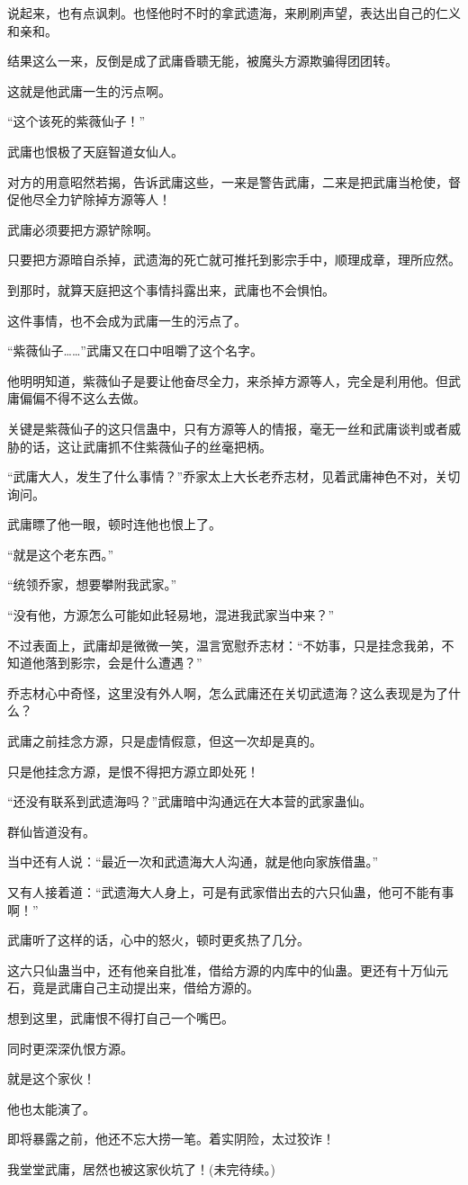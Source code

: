 \begin{this_body}
说起来，也有点讽刺。也怪他时不时的拿武遗海，来刷刷声望，表达出自己的仁义和亲和。

结果这么一来，反倒是成了武庸昏聩无能，被魔头方源欺骗得团团转。

这就是他武庸一生的污点啊。

“这个该死的紫薇仙子！”

武庸也恨极了天庭智道女仙人。

对方的用意昭然若揭，告诉武庸这些，一来是警告武庸，二来是把武庸当枪使，督促他尽全力铲除掉方源等人！

武庸必须要把方源铲除啊。

只要把方源暗自杀掉，武遗海的死亡就可推托到影宗手中，顺理成章，理所应然。

到那时，就算天庭把这个事情抖露出来，武庸也不会惧怕。

这件事情，也不会成为武庸一生的污点了。

“紫薇仙子……”武庸又在口中咀嚼了这个名字。

他明明知道，紫薇仙子是要让他奋尽全力，来杀掉方源等人，完全是利用他。但武庸偏偏不得不这么去做。

关键是紫薇仙子的这只信蛊中，只有方源等人的情报，毫无一丝和武庸谈判或者威胁的话，这让武庸抓不住紫薇仙子的丝毫把柄。

“武庸大人，发生了什么事情？”乔家太上大长老乔志材，见着武庸神色不对，关切询问。

武庸瞟了他一眼，顿时连他也恨上了。

“就是这个老东西。”

“统领乔家，想要攀附我武家。”

“没有他，方源怎么可能如此轻易地，混进我武家当中来？”

不过表面上，武庸却是微微一笑，温言宽慰乔志材：“不妨事，只是挂念我弟，不知道他落到影宗，会是什么遭遇？”

乔志材心中奇怪，这里没有外人啊，怎么武庸还在关切武遗海？这么表现是为了什么？

武庸之前挂念方源，只是虚情假意，但这一次却是真的。

只是他挂念方源，是恨不得把方源立即处死！

“还没有联系到武遗海吗？”武庸暗中沟通远在大本营的武家蛊仙。

群仙皆道没有。

当中还有人说：“最近一次和武遗海大人沟通，就是他向家族借蛊。”

又有人接着道：“武遗海大人身上，可是有武家借出去的六只仙蛊，他可不能有事啊！”

武庸听了这样的话，心中的怒火，顿时更炙热了几分。

这六只仙蛊当中，还有他亲自批准，借给方源的内库中的仙蛊。更还有十万仙元石，竟是武庸自己主动提出来，借给方源的。

想到这里，武庸恨不得打自己一个嘴巴。

同时更深深仇恨方源。

就是这个家伙！

他也太能演了。

即将暴露之前，他还不忘大捞一笔。着实阴险，太过狡诈！

我堂堂武庸，居然也被这家伙坑了！(未完待续。)

\end{this_body}

